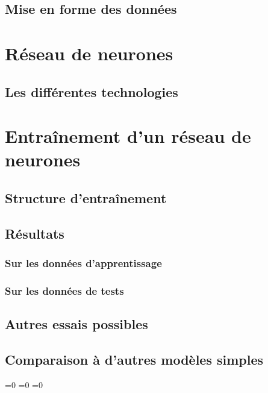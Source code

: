 \documentclass[11pt,a4paper]{article}
\begin{document}
\subsection{Mise en forme des données}

\section{Réseau de neurones}
\subsection{Les différentes technologies}

\section{Entraînement d'un réseau de neurones}
\subsection{Structure d'entraînement}
\subsection{Résultats}
\subsubsection{Sur les données d'apprentissage}
\subsubsection{Sur les données de tests}
\subsection{Autres essais possibles}
\subsection{Comparaison à d'autres modèles simples}

\setcounter{section}{0}


%
%
%
%


\makeatletter
\ifnum{}=0
\clearpage
\else\ifnum{}=0
\clearpage
\else\ifnum{}=0
\clearpage
\fi\fi\fi

\renewcommand{\sectionbreak}{}
\end{document}
